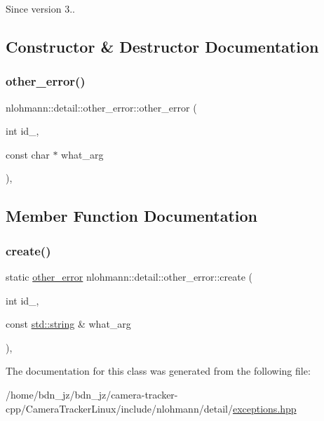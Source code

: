 \begin{DoxySince}{Since}
version 3.. 
\end{DoxySince}


\subsection{Constructor \& Destructor Documentation}
\mbox{\label{classnlohmann_1_1detail_1_1other__error_adf9227d6ca5161508f6a598a0dc6e7cd}} 
\subsubsection{\texorpdfstring{other\+\_\+error()}{other\_error()}}
{\footnotesize\ttfamily nlohmann\+::detail\+::other\+\_\+error\+::other\+\_\+error (\begin{DoxyParamCaption}\item[{int}]{id\+\_\+,  }\item[{const char $\ast$}]{what\+\_\+arg }\end{DoxyParamCaption})\hspace{0.3cm}{\ttfamily [inline]}, {\ttfamily [private]}}



\subsection{Member Function Documentation}
\mbox{\label{classnlohmann_1_1detail_1_1other__error_a87e8ab894e8c85c0d97a0919782d3683}} 
\subsubsection{\texorpdfstring{create()}{create()}}
{\footnotesize\ttfamily static \hyperlink{classnlohmann_1_1detail_1_1other__error}{other\+\_\+error} nlohmann\+::detail\+::other\+\_\+error\+::create (\begin{DoxyParamCaption}\item[{int}]{id\+\_\+,  }\item[{const \hyperlink{namespacenlohmann_1_1detail_a1ed8fc6239da25abcaf681d30ace4985ab45cffe084dd3d20d928bee85e7b0f21}{std\+::string} \&}]{what\+\_\+arg }\end{DoxyParamCaption})\hspace{0.3cm}{\ttfamily [inline]}, {\ttfamily [static]}}



The documentation for this class was generated from the following file\+:\begin{DoxyCompactItemize}
\item 
/home/bdn\+\_\+jz/bdn\+\_\+jz/camera-\/tracker-\/cpp/\+Camera\+Tracker\+Linux/include/nlohmann/detail/\hyperlink{exceptions_8hpp}{exceptions.\+hpp}\end{DoxyCompactItemize}
